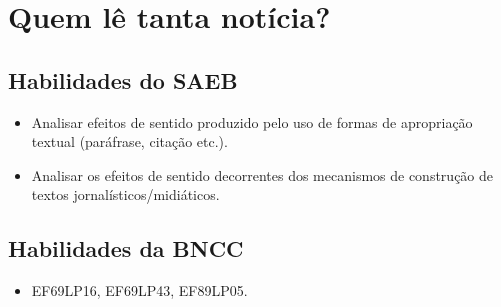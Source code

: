 \chapter{Quem lê tanta notícia?}

\section{Habilidades do SAEB}

\begin{itemize}
\item
  Analisar efeitos de sentido produzido pelo uso de formas de
  apropriação textual (paráfrase, citação etc.).
\item
  Analisar os efeitos de sentido decorrentes dos mecanismos de
  construção de textos jornalísticos/midiáticos.
\end{itemize}

\section*{Habilidades da BNCC}

\begin{itemize}
\item EF69LP16, EF69LP43, EF89LP05.
\end{itemize}



